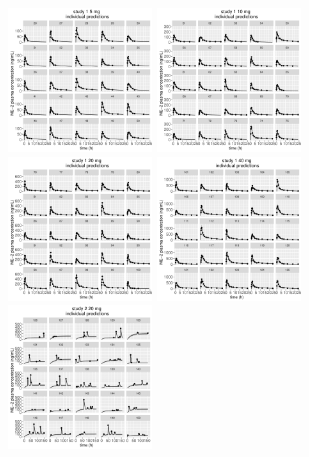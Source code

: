 \documentclass[10pt, reqno, oneside]{amsbook}
\numberwithin{equation}{chapter}
\numberwithin{figure}{chapter}
\numberwithin{table}{chapter}
\theoremstyle{remark}
\begin{document}
\begin{figure}[!htb]
  \includegraphics[width=1.5in,trim=0in 0in 0 0in]{graphics/effCptModelTorsten_0.82/effCptPlots011.pdf}
  \includegraphics[width=1.5in,trim=0in 0in 0 0in]{graphics/effCptModelTorsten_0.82/effCptPlots012.pdf}
  \includegraphics[width=1.5in,trim=0in 0in 0 0in]{graphics/effCptModelTorsten_0.82/effCptPlots013.pdf}
  \includegraphics[width=1.5in,trim=0in 0in 0 0in]{graphics/effCptModelTorsten_0.82/effCptPlots014.pdf}
  \includegraphics[width=1.5in,trim=0in 0in 0 0in]{graphics/effCptModelTorsten_0.82/effCptPlots019.pdf}

\end{figure}
\end{document}
